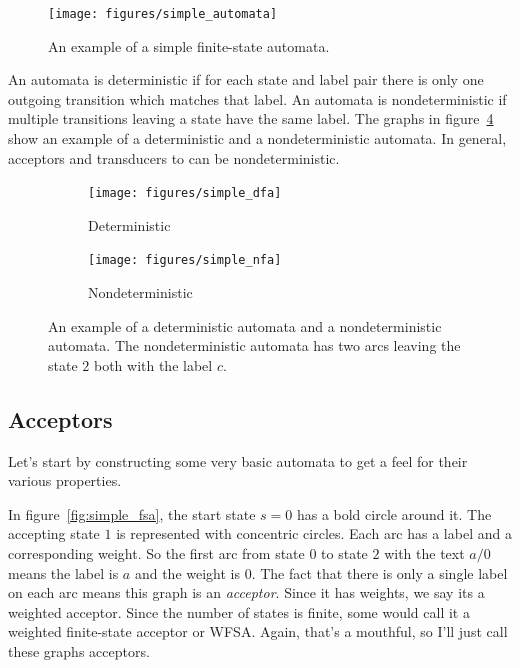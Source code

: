\begin{figure}
    \centering
    \texttt{[image: figures/simple\_automata]}
    \caption{An example of a simple finite-state automata.}
    \label{fig:simple_automata}
 \end{figure}

An automata is deterministic if for each state and label pair there is only one
outgoing transition which matches that label. An automata is nondeterministic
if multiple transitions leaving a state have the same label. The graphs in
figure~\ref{fig:dfa_nfa} show an example of a deterministic and a
nondeterministic automata. In general, acceptors and transducers to can be
nondeterministic.

\begin{figure}
    \centering
    \begin{subfigure}[b]{0.48\textwidth}
        \texttt{[image: figures/simple\_dfa]}
        \caption{Deterministic}
        \label{fig:simple_dfa}
    \end{subfigure}
    \begin{subfigure}[b]{0.48\textwidth}
        \texttt{[image: figures/simple\_nfa]}
        \caption{Nondeterministic}
        \label{fig:simple_nfa}
    \end{subfigure}
    \caption{An example of a deterministic automata and a
    nondeterministic automata. The nondeterministic automata has
    two arcs leaving the state $2$ both with the label $c$.}
    \label{fig:dfa_nfa}
\end{figure}

\subsection{Acceptors}

Let's start by constructing some very basic automata to get a feel for their
various properties.

In figure~\ref{fig:simple_fsa}, the start state $s = 0$ has a bold circle
around it. The accepting state $1$ is
represented with concentric circles. Each arc has a label and a corresponding
weight. So the first arc from state $0$ to state $2$ with the text $a/0$ means
the label is $a$ and the weight is $0$. The fact that there is only a single
label on each arc means this graph is an \emph{acceptor}. Since it has weights,
we say its a weighted acceptor. Since the number of states is finite, some
would call it a weighted finite-state acceptor or WFSA. Again, that's a
mouthful, so I'll just call these graphs acceptors.

